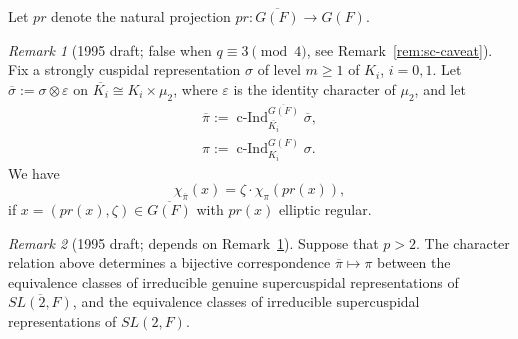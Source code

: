 \documentclass[12pt,letterpaper,openany]{book}
\theoremstyle{plain}
\theoremstyle{definition}
\theoremstyle{remark}
\theoremstyle{remark}
\newtheorem{remyy}{Remark}
\begin{document}
Let $pr$ denote the natural projection $pr:\overline{G(F)}\rightarrow G(F)$.

\begin{remyy}[1995 draft; false when $q\equiv3\pmod4$, see Remark~\ref{rem:sc-caveat}] Fix a strongly cuspidal representation $\sigma$
of level $m\geq 1$ of $K_i$, $i=0,1$. Let
$\overline{\sigma}:=\sigma \otimes \varepsilon$ on
$\overline{K_i}\cong K_i\times \mu_2$, where $\varepsilon$ is the
identity character of $\mu_2$, and let
$$
\begin{array}{c}
\overline{\pi}
:=\operatorname{c\text{-}Ind}_{\overline{K_i}}^{\overline{G(F)}}\overline{\sigma},\\
\pi
:=\operatorname{c\text{-}Ind}_{K_i}^{G(F)}\sigma.
\end{array}
$$
We have
\begin{equation}
\chi_{\overline{\pi}}(x)=\zeta\cdot\chi_{\pi}(pr(x)),\label{eq:sc-relation}
\end{equation}
if $x=(pr(x),\zeta )\in \overline{G(F)}$ with $pr(x)$
elliptic regular.
\label{prop:164}
\end{remyy}

\begin{remyy}[1995 draft; depends on Remark~\ref{prop:164}] Suppose that $p>2$. The character relation above
determines a bijective correspondence
$\overline{\pi}\longmapsto \pi$
between the equivalence classes of irreducible genuine supercuspidal
representations of $\overline{SL(2,F)}$, and the equivalence
classes of irreducible supercuspidal representations of $SL(2,F)$.
\end{remyy}
\end{document}
